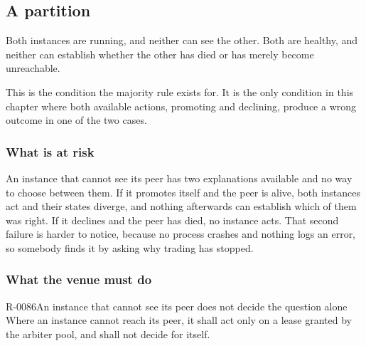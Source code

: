 \subsection{A partition}
\label{sec:ha:enabled:partition}

Both instances are running, and neither can see the other. Both are healthy, and
neither can establish whether the other has died or has merely become
unreachable.

This is the condition the majority rule exists for. It is the only condition in
this chapter where both available actions, promoting and declining, produce a
wrong outcome in one of the two cases.

\subsubsection{What is at risk}
\label{sec:ha:enabled:partition:risk}

An instance that cannot see its peer has two explanations available and no way to
choose between them. If it promotes itself and the peer is alive, both instances
act and their states diverge, and nothing afterwards can establish which of them
was right. If it declines and the peer has died, no instance acts. That second
failure is harder to notice, because no process crashes and nothing logs an
error, so somebody finds it by asking why trading has stopped.

\subsubsection{What the venue must do}
\label{sec:ha:enabled:partition:behaviour}

\begin{requirement}{R-0086}{An instance that cannot see its peer does not decide the question alone}
  Where an instance cannot reach its peer, it shall act only on a lease granted
  by the arbiter pool, and shall not decide for itself.
\end{requirement}

